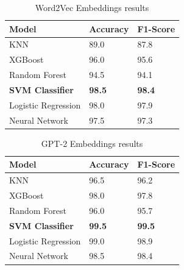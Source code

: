 \begin{table}[hbt!]
\begin{threeparttable}
\caption{Word2Vec Embeddings results}
\label{word2vec_embeddings_results}
\begin{tabular}{lll}
\toprule
\headrow Model & Accuracy & F1-Score\\
\midrule
 KNN            &       89.0   &       87.8 \\
 XGBoost        &       96.0   &       95.6 \\
 Random Forest &       94.5 &       94.1 \\
 \textbf{SVM Classifier}            &       \textbf{98.5} &       \textbf{98.4} \\
 Logistic Regression             &       98.0   &       97.9 \\
 Neural Network  &       97.5 &       97.3 \\
\bottomrule
\end{tabular}
\end{threeparttable}
\end{table}

\begin{table}[hbt!]
\begin{threeparttable}
\caption{GPT-2 Embeddings results}
\label{gpt2_embeddings_results}
\begin{tabular}{lll}
\toprule
\headrow Model & Accuracy & F1-Score\\
\midrule
 KNN                &       96.5 &       96.2 \\
 XGBoost            &       98.0   &       97.8 \\
 Random Forest       &       96.0   &       95.7 \\
 \textbf{SVM Classifier}                &       \textbf{99.5} &       \textbf{99.5} \\
 Logistic Regression                 &       99.0   &       98.9 \\
 Neural Network      &       98.5 &       98.4 \\
\bottomrule
\end{tabular}
\end{threeparttable}
\end{table}

